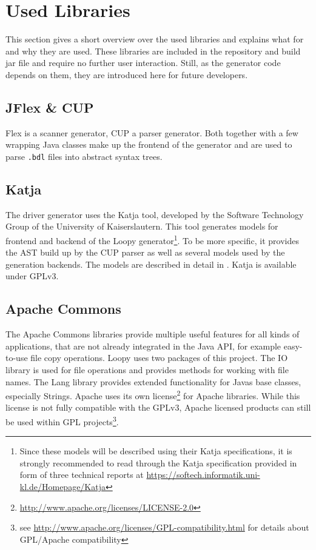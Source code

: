 \documentclass{report}
\begin{document}
\section{Used Libraries}
This section gives a short overview over the used libraries and explains what for and why they are used. These libraries are included in the repository and build jar file and require no further user interaction. Still, as the generator code depends on them, they are introduced here for future developers.

\subsection{JFlex \& CUP}
Flex is a scanner generator, CUP a parser generator. Both together with a few wrapping Java classes make up the frontend of the generator and are used to parse \texttt{.bdl} files into abstract syntax trees. %

\subsection{Katja}
The driver generator uses the Katja tool, developed by the Software Technology Group of the University of Kaiserslautern. This tool generates models for frontend and backend of the Loopy generator\footnote{Since these models will be described using their Katja specifications, it is strongly recommended to read through the Katja specification provided in form of three technical reports at \url{https://softech.informatik.uni-kl.de/Homepage/Katja}}. To be more specific, it provides the AST build up by the CUP parser as well as several models used by the generation backends. The models are described in detail in . Katja is available under GPLv3.

\subsection{Apache Commons}
The Apache Commons libraries provide multiple useful features for all kinds of applications, that are not already integrated in the Java API, for example easy-to-use file copy operations. Loopy uses two packages of this project. The IO library is used for file operations and provides methods for working with file names. The Lang library provides extended functionality for Javas base classes, especially Strings. Apache uses its own license\footnote{\url{http://www.apache.org/licenses/LICENSE-2.0}} for Apache libraries. While this license is not fully compatible with the GPLv3, Apache licensed products can still be used within GPL projects\footnote{see \url{http://www.apache.org/licenses/GPL-compatibility.html} for details about GPL/Apache compatibility}.
\end{document}
